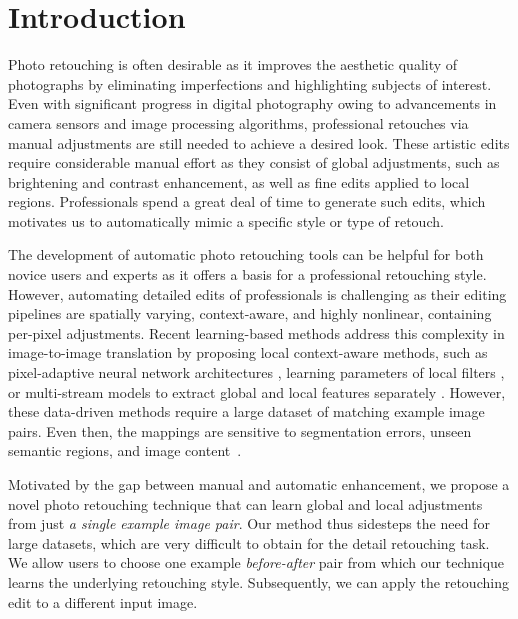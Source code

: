 


\section{Introduction}\label{sec:introduction}

Photo retouching is often desirable as it improves the aesthetic quality of photographs by eliminating imperfections and \nobreak highlighting subjects of interest. Even with significant progress in digital photography owing to advancements in camera sensors and image processing algorithms, professional retouches via manual adjustments are still needed to achieve a desired look. These artistic edits require considerable manual effort as they consist of global adjustments, such as brightening and contrast enhancement, as well as fine edits applied to local regions. Professionals spend a great deal of time to generate such edits, which motivates us to automatically mimic a specific style or type of retouch.

The development of automatic photo retouching tools can be helpful for both novice users and experts as it offers a basis for a professional retouching style. However, automating detailed edits of professionals is challenging as their editing pipelines are spatially varying, context-aware, and highly nonlinear, containing per-pixel adjustments. Recent learning-based methods address this complexity in image-to-image translation by proposing local context-aware methods, such as pixel-adaptive neural network architectures \cite{shaham2021spatially, li2020lapar}, learning parameters of local filters \cite{moran2020deeplpf}, or multi-stream models to extract global and local features separately \cite{Gharbi17Deep}. However, these data-driven methods require a large dataset of matching example image pairs. Even then, the mappings are sensitive to segmentation errors, unseen semantic regions, and image content~\cite{yan2016automatic}. %

Motivated by the gap between manual and automatic enhancement, we propose a novel photo retouching technique that can learn global and local adjustments from just \emph{a single example image pair}. Our method thus sidesteps the need for large datasets, which are very difficult to obtain for the detail retouching task. We allow users to choose one example \emph{before-after} pair from which our technique learns the underlying retouching style. Subsequently, we can apply the retouching edit to a different input image.

